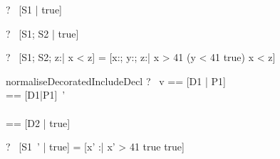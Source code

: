 \begin{zed}
  \vdash?~ [S1 | true] 
\end{zed}

\begin{zed}
  \vdash?~ [S1; S2 | true] 
\end{zed}

\begin{zed}
  \vdash?~ [S1; S2; z:\nat | x < z] =
           [x:\nat; y:\nat; z:\nat | x > 41 \land (y < 41 \land true)
                                     \land x < z]
\end{zed}

\begin{zedrule}{normaliseDecoratedIncludeDecl}
   \proviso ?~ v == [D1 | P1] \\
   \proviso [D2|P2] == [D1|P1]~' \\
   [D | true] \unfoldsTo [D3 | P3] \\
   \proviso [D4 | true] == [D2 | true] \schemamerge [D3 | true]
\derives
   [v~'; D | true] \unfoldsTo [D4 | P2 \land P3]
\end{zedrule}

\begin{zed}
  \vdash?~ [S1~' | true]  = [x' :\nat | x' > 41 \land true \land true]
\end{zed}
